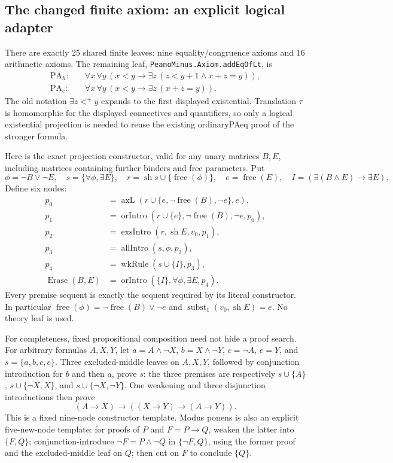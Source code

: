 \subsection{The changed finite axiom: an explicit logical adapter}

There are exactly 25 shared finite leaves: nine equality/congruence
axioms and 16 arithmetic axioms.  The remaining leaf,
\texttt{PeanoMinus.Axiom.addEqOfLt}, is
\begin{align*}
 \mathrm{PA}_h:\quad&
 \forall x\,\forall y\,
   (x<y\to\exists z\,(z<y+1\land x+z=y)),\\
 \mathrm{PA}_c:\quad&
 \forall x\,\forall y\,
   (x<y\to\exists z\,(x+z=y)).
\end{align*}
The old notation $\exists z<^{+}y$ expands to the first displayed
existential.  Translation $\tau$ is homomorphic for the displayed
connectives and quantifiers, so only a logical existential projection is
needed to reuse the existing ordinaryPAeq proof of the stronger formula.

Here is the exact projection constructor, valid for any unary matrices
$B,E$, including matrices containing further binders and free parameters.
Put
\[
 \phi=\neg B\vee\neg E,\quad
 s=\{\forall\phi,\exists E\},\quad
 r=\operatorname{sh}s\cup\{\operatorname{free}(\phi)\},\quad
 e=\operatorname{free}(E),\quad
 I=(\exists(B\land E)\to\exists E).
\]
Define six nodes:
\begin{align*}
 p_0&=\operatorname{axL}
       (r\cup\{e,\neg\operatorname{free}(B),\neg e\},e),\\
 p_1&=\operatorname{orIntro}
       (r\cup\{e\},\neg\operatorname{free}(B),\neg e,p_0),\\
 p_2&=\operatorname{exsIntro}(r,\operatorname{sh}E,v_0,p_1),\\
 p_3&=\operatorname{allIntro}(s,\phi,p_2),\\
 p_4&=\operatorname{wkRule}(s\cup\{I\},p_3),\\
 \operatorname{Erase}(B,E)&=
       \operatorname{orIntro}(\{I\},\forall\phi,\exists E,p_4).
\end{align*}
Every premise sequent is exactly the sequent required by its literal
constructor.  In particular
$\operatorname{free}(\phi)=
\neg\operatorname{free}(B)\vee\neg e$ and
$\operatorname{subst}_1(v_0,\operatorname{sh}E)=e$.
No theory leaf is used.

For completeness, fixed propositional composition need not hide a proof
search.  For arbitrary formulas $A,X,Y$, let
$a=A\land\neg X$, $b=X\land\neg Y$, $c=\neg A$, $e=Y$,
and $s=\{a,b,c,e\}$.
Three excluded-middle leaves on $A,X,Y$, followed by conjunction
introduction for $b$ and then $a$, prove $s$:
the three premises are respectively $s\cup\{A\}$,
$s\cup\{\neg X,X\}$, and $s\cup\{\neg X,\neg Y\}$.
One weakening and three disjunction introductions then prove
\[
 (A\to X)\to((X\to Y)\to(A\to Y)).
\]
This is a fixed nine-node constructor template.
Modus ponens is also an explicit five-new-node template: for proofs of
$P$ and $F=P\to Q$, weaken the latter into $\{F,Q\}$;
conjunction-introduce $\neg F=P\land\neg Q$ in
$\{\neg F,Q\}$, using the former proof and the excluded-middle
leaf on $Q$; then cut on $F$ to conclude $\{Q\}$.

